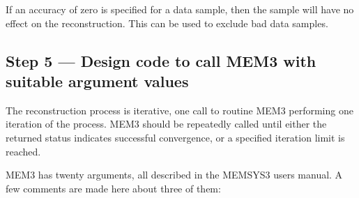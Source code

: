 If an accuracy of zero is specified for a data sample, then the sample will
have  no effect on the reconstruction. This can be used to exclude bad data
samples.


\subsection {Step 5 --- Design code to call MEM3 with suitable argument values}
The reconstruction process is iterative, one call to routine MEM3 performing
one iteration of the process. MEM3 should be repeatedly called until either
the returned status indicates successful convergence, or a specified iteration
limit is reached.

MEM3 has twenty arguments, all described in the MEMSYS3 users manual. A few
comments are made here about three of them:

